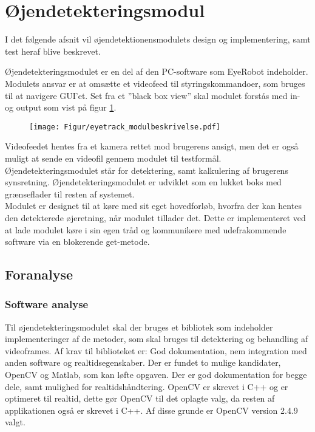 %

%

\section{Øjendetekteringsmodul}

I det følgende afsnit vil øjendetektionensmodulets design og implementering, samt test heraf blive beskrevet. 

Øjendetekteringsmodulet er en del af den PC-software som EyeRobot indeholder. Modulets ansvar er at omsætte et videofeed til styringskommandoer, som bruges til at navigere GUI'et.
Set fra et ”black box view” skal modulet forstås med in- og output som vist på figur \ref{fig:eyetrack_modulbeskrivelse}.

\begin{figure}[H] 
\centering
	\texttt{[image: Figur/eyetrack\_modulbeskrivelse.pdf]}
	\label{fig:eyetrack_modulbeskrivelse}
\end{figure}

Videofeedet hentes fra et kamera rettet mod brugerens ansigt, men det er også muligt at sende en videofil gennem modulet til testformål.
Øjendetekteringsmodulet står for detektering, samt kalkulering af brugerens synsretning. 
Øjendetekteringsmodulet er udviklet som en lukket boks med grænseflader til resten af systemet. \\
Modulet er designet til at køre med sit eget hovedforløb, hvorfra der kan hentes den detekterede øjeretning, når modulet tillader det. 
Dette er implementeret ved at lade modulet køre i sin egen tråd og kommunikere med udefrakommende software via en blokerende get-metode. 

\subsection{Foranalyse}
\subsubsection{Software analyse}
Til øjendetekteringsmodulet skal der bruges et bibliotek som indeholder implementeringer af de metoder, som skal bruges til detektering og behandling af videoframes. 
Af krav til biblioteket er: God dokumentation, nem integration med anden software og realtidsegenskaber. 
Der er fundet to mulige kandidater, OpenCV og Matlab, som kan løfte opgaven. 
Der er god dokumentation for begge dele, samt mulighed for realtidshåndtering. 
OpenCV er skrevet i C++ og er optimeret til realtid, dette gør OpenCV til det oplagte valg, da resten af applikationen også er skrevet i C++. 
Af disse grunde er OpenCV version 2.4.9 valgt.  

